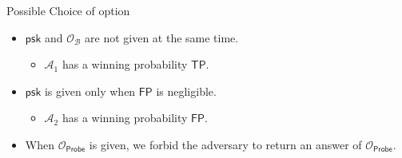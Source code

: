 \begin{frame}{Possible Choice of \textsf{option}}

\begin{itemize}

	\item $\textsf{psk}$ and $\mathcal{O}_{\mathcal{B}}$ are not given at the same time.

	\begin{itemize}
		\item<2-> $\mathcal{A}_1$ has a winning probability $\textsf{TP}$.
	\end{itemize}

	\item<3-> $\textsf{psk}$ is given only when $\textsf{FP}$ is negligible.
	\begin{itemize}
		\item<4-> $\mathcal{A}_2$ has a winning probability $\textsf{FP}$.
	\end{itemize}

	\item<5-> When $\mathcal{O}_{\textsf{Probe}}$ is given, we forbid the adversary to return an answer of $\mathcal{O}_{\textsf{Probe}}$.

\end{itemize}

\begin{columns}

\end{columns}
\end{frame}
